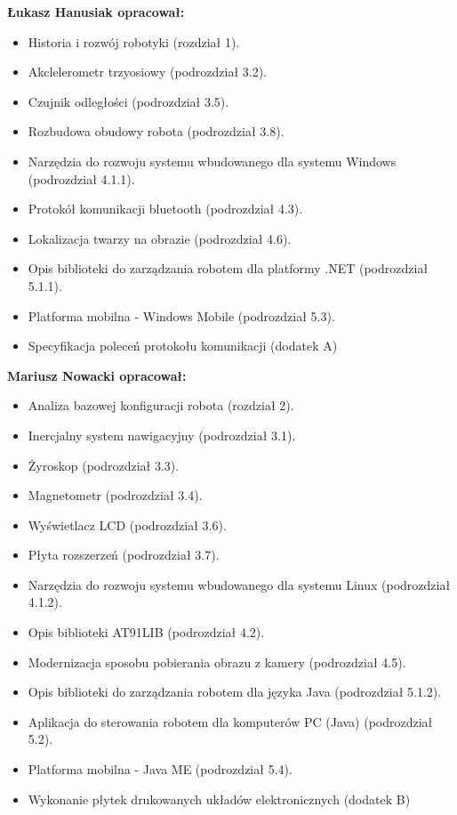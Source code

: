 \documentclass[a4paper,12pt, oneside]{mwbk}
\begin{document}
\textbf{Łukasz Hanusiak opracował:}
\begin{itemize}
  \item Historia i rozwój robotyki (rozdział 1).
  \item Akclelerometr trzyosiowy (podrozdział 3.2).
  \item Czujnik odległości (podrozdział 3.5).
  \item Rozbudowa obudowy robota (podrozdział 3.8).
  \item Narzędzia do rozwoju systemu wbudowanego dla systemu Windows (podrozdział 4.1.1).
  \item Protokół komunikacji bluetooth (podrozdział 4.3).
  \item Lokalizacja twarzy na obrazie (podrozdział 4.6).
  \item Opis biblioteki do zarządzania robotem dla platformy .NET (podrozdział 5.1.1).
  \item Platforma mobilna - Windows Mobile (podrozdział 5.3).
  \item Specyfikacja poleceń protokołu komunikacji (dodatek A)
\end{itemize}

\textbf{Mariusz Nowacki opracował:}
\begin{itemize}
  \item Analiza bazowej konfiguracji robota (rozdział 2).
  \item Inercjalny system nawigacyjny (podrozdział 3.1).
  \item Żyroskop (podrozdział 3.3).
  \item Magnetometr (podrozdział 3.4).
  \item Wyświetlacz LCD (podrozdział 3.6).
  \item Płyta rozszerzeń (podrozdział 3.7).
  \item Narzędzia do rozwoju systemu wbudowanego dla systemu Linux (podrozdział 4.1.2).
  \item Opis biblioteki AT91LIB (podrozdział 4.2).
  \item Modernizacja sposobu pobierania obrazu z kamery (podrozdział 4.5).
  \item Opis biblioteki do zarządzania robotem dla języka Java (podrozdział 5.1.2).
  \item Aplikacja do sterowania robotem dla komputerów PC (Java) (podrozdział 5.2).
  \item Platforma mobilna - Java ME (podrozdział 5.4).
  \item Wykonanie płytek drukowanych układów elektronicznych (dodatek B)
\end{itemize}
\end{document}
